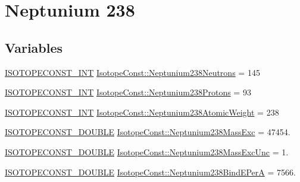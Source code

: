 \hypertarget{group___isotope_const-_neptunium-_np238}{}\section{Neptunium 238}
\label{group___isotope_const-_neptunium-_np238}
\subsection*{Variables}
\begin{DoxyCompactItemize}
\item 
\mbox{\hyperlink{group___isotope_const-_macros_ga5f18360b3e99483a35c32d789e62621c}{I\+S\+O\+T\+O\+P\+E\+C\+O\+N\+S\+T\+\_\+\+I\+NT}} \mbox{\hyperlink{group___isotope_const-_neptunium-_np238_ga6d82f556c4b34036d590b88396ac1fb8}{Isotope\+Const\+::\+Neptunium238\+Neutrons}} = 145
\item 
\mbox{\hyperlink{group___isotope_const-_macros_ga5f18360b3e99483a35c32d789e62621c}{I\+S\+O\+T\+O\+P\+E\+C\+O\+N\+S\+T\+\_\+\+I\+NT}} \mbox{\hyperlink{group___isotope_const-_neptunium-_np238_ga4f72f4ed51b689605e3b8834ca45151d}{Isotope\+Const\+::\+Neptunium238\+Protons}} = 93
\item 
\mbox{\hyperlink{group___isotope_const-_macros_ga5f18360b3e99483a35c32d789e62621c}{I\+S\+O\+T\+O\+P\+E\+C\+O\+N\+S\+T\+\_\+\+I\+NT}} \mbox{\hyperlink{group___isotope_const-_neptunium-_np238_ga21751f1d62ac293f487a7be6ef6e644d}{Isotope\+Const\+::\+Neptunium238\+Atomic\+Weight}} = 238
\item 
\mbox{\hyperlink{group___isotope_const-_macros_ga8f45a7272ce02c0b4c65c44636ed719a}{I\+S\+O\+T\+O\+P\+E\+C\+O\+N\+S\+T\+\_\+\+D\+O\+U\+B\+LE}} \mbox{\hyperlink{group___isotope_const-_neptunium-_np238_ga550bfb467dedf3e8d109753294b21d4c}{Isotope\+Const\+::\+Neptunium238\+Mass\+Exc}} = 47454.
\item 
\mbox{\hyperlink{group___isotope_const-_macros_ga8f45a7272ce02c0b4c65c44636ed719a}{I\+S\+O\+T\+O\+P\+E\+C\+O\+N\+S\+T\+\_\+\+D\+O\+U\+B\+LE}} \mbox{\hyperlink{group___isotope_const-_neptunium-_np238_ga5479adbac34537c7f4daefac033cbf60}{Isotope\+Const\+::\+Neptunium238\+Mass\+Exc\+Unc}} = 1.
\item 
\mbox{\hyperlink{group___isotope_const-_macros_ga8f45a7272ce02c0b4c65c44636ed719a}{I\+S\+O\+T\+O\+P\+E\+C\+O\+N\+S\+T\+\_\+\+D\+O\+U\+B\+LE}} \mbox{\hyperlink{group___isotope_const-_neptunium-_np238_ga7cf54b6d9bf7d43a48d4b22b0fca5001}{Isotope\+Const\+::\+Neptunium238\+Bind\+E\+PerA}} = 7566.
\item 

\end{DoxyCompactItemize}
